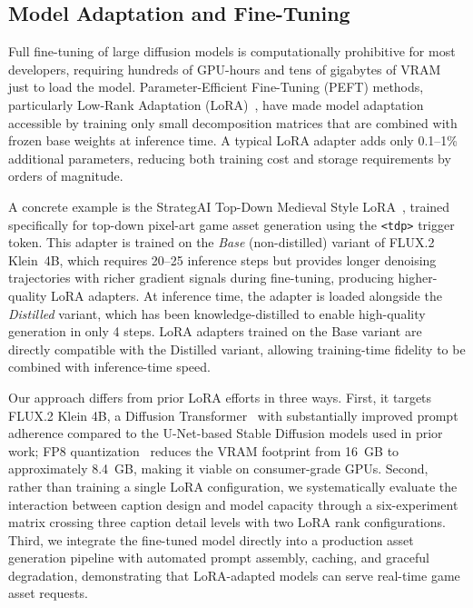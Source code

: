 \documentclass[conference]{IEEEtran}
\begin{document}
\subsection{Model Adaptation and Fine-Tuning}

Full fine-tuning of large diffusion models is computationally prohibitive for most developers, requiring hundreds of GPU-hours and tens of gigabytes of VRAM just to load the model. Parameter-Efficient Fine-Tuning (PEFT) methods, particularly Low-Rank Adaptation (LoRA)~\cite{hu2022lora}, have made model adaptation accessible by training only small decomposition matrices that are combined with frozen base weights at inference time. A typical LoRA adapter adds only 0.1--1\% additional parameters, reducing both training cost and storage requirements by orders of magnitude.

A concrete example is the StrategAI Top-Down Medieval Style LoRA~\cite{strategai2026topdownlora}, trained specifically for top-down pixel-art game asset generation using the \texttt{<tdp>} trigger token. This adapter is trained on the \emph{Base} (non-distilled) variant of FLUX.2 Klein~4B, which requires 20--25 inference steps but provides longer denoising trajectories with richer gradient signals during fine-tuning, producing higher-quality LoRA adapters. At inference time, the adapter is loaded alongside the \emph{Distilled} variant, which has been knowledge-distilled to enable high-quality generation in only 4 steps. LoRA adapters trained on the Base variant are directly compatible with the Distilled variant, allowing training-time fidelity to be combined with inference-time speed.

Our approach differs from prior LoRA efforts in three ways. First, it targets FLUX.2 Klein 4B, a Diffusion Transformer~\cite{peebles2023scalable} with substantially improved prompt adherence compared to the U-Net-based Stable Diffusion models used in prior work; FP8 quantization~\cite{lin2024fp8} reduces the VRAM footprint from 16~GB to approximately 8.4~GB, making it viable on consumer-grade GPUs. Second, rather than training a single LoRA configuration, we systematically evaluate the interaction between caption design and model capacity through a six-experiment matrix crossing three caption detail levels with two LoRA rank configurations. Third, we integrate the fine-tuned model directly into a production asset generation pipeline with automated prompt assembly, caching, and graceful degradation, demonstrating that LoRA-adapted models can serve real-time game asset requests.
\end{document}
